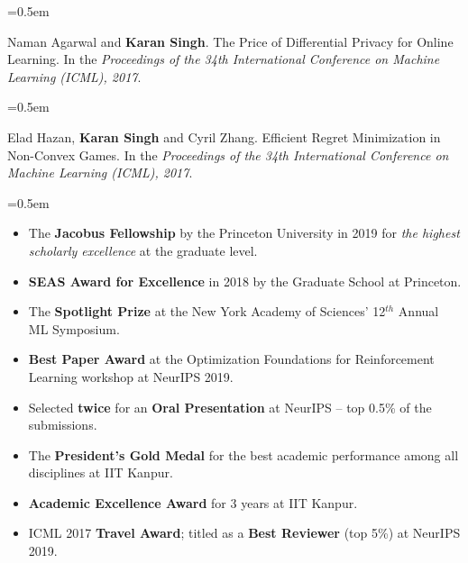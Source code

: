 \documentclass{scrartcl}
\newcommand{\Description}[1]{\hangindent=0.5em\hangafter=0\noindent\raggedright\footnotesize{#1}\par\normalsize\vspace{1em}} %
\begin{document}
\begin{cv}{}
\vspace{-0.3em}
\Description{Naman Agarwal and \textbf{Karan Singh}. The Price of Differential Privacy for Online Learning. In the \textit{Proceedings of the 34th International Conference on Machine Learning (ICML), 2017}.}
\vspace{-0.3em}
\Description{Elad Hazan, \textbf{Karan Singh} and Cyril Zhang. Efficient Regret Minimization in Non-Convex Games. In the \textit{Proceedings of the 34th International Conference on Machine Learning (ICML), 2017}.}

\noindent{}

\Description{
\begin{itemize}
\item[\Forward] The \textbf{Jacobus Fellowship} by the Princeton University in 2019 for {\em the highest scholarly excellence} at the graduate level. 
\vspace{-0.25em}
\item[\Forward] \textbf{SEAS Award for Excellence} in 2018 by the Graduate School at Princeton.
\vspace{-0.25em}
\item[\Forward] The \textbf{Spotlight Prize} at the New York Academy of Sciences' 12$^{th}$ Annual ML Symposium.
\vspace{-0.25em}
\item[\Forward] \textbf{Best Paper Award} at the Optimization Foundations for Reinforcement Learning workshop at NeurIPS 2019.
\vspace{-0.25em}
\item[\Forward] Selected \textbf{twice} for an \textbf{Oral Presentation} at NeurIPS -- top 0.5\% of the submissions.
\vspace{-0.25em}
\item[\Forward] The \textbf{President's Gold Medal} for the best academic performance among all disciplines at IIT Kanpur.
\vspace{-0.25em}
\item[\Forward]\textbf{Academic Excellence Award} for 3 years at IIT Kanpur.
\vspace{-0.25em}
\item[\Forward] ICML 2017 \textbf{Travel Award}; titled as a \textbf{Best Reviewer} (top 5\%) at NeurIPS 2019.
\end{itemize}
\vspace{-0.25em}
}

\noindent{}


\end{cv}
\end{document}
